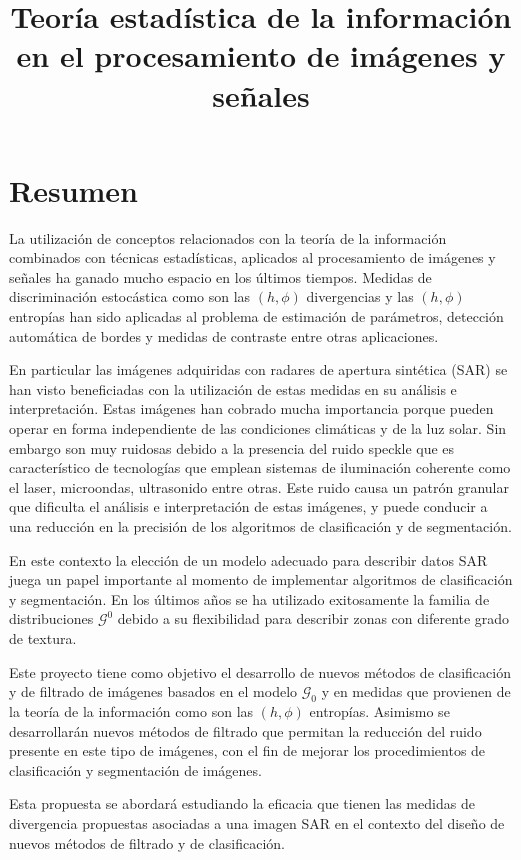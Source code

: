 \documentclass[11pt]{article}
\title{\textbf{Teoría estadística de la información \\en el procesamiento de imágenes y señales}}
\date{}
\begin{document}
	
	\maketitle

\section{Resumen}
La utilización de conceptos relacionados con la teoría de la información combinados con técnicas estadísticas, aplicados al procesamiento de imágenes y señales ha ganado mucho espacio en los últimos tiempos. Medidas de discriminación estocástica como son las $(h,\phi)$ divergencias y las $(h,\phi)$ entropías han sido aplicadas al problema de estimación de parámetros, detección automática de bordes y medidas de contraste entre otras aplicaciones. 

En particular las imágenes adquiridas con radares de apertura sintética (SAR) se han visto beneficiadas con la utilización de estas medidas en su análisis e interpretación. Estas imágenes han cobrado mucha importancia porque pueden operar en forma independiente de las condiciones climáticas y de la luz solar. Sin embargo son muy ruidosas debido a la presencia del ruido speckle que es característico de tecnologías que emplean sistemas de iluminación coherente como el laser, microondas, ultrasonido entre otras. Este ruido causa un patrón granular que dificulta el análisis e interpretación de estas imágenes, y puede conducir a una reducción en la precisión de los algoritmos de clasificación y de segmentación. 

En este contexto la elección de un modelo adecuado para describir datos SAR juega un papel importante al momento de implementar algoritmos de clasificación y segmentación. En los últimos años se ha utilizado exitosamente la familia de distribuciones $\mathcal{G}^0$ debido a su flexibilidad para describir zonas con diferente grado de textura.  
 
Este proyecto tiene como objetivo el desarrollo de nuevos métodos de clasificación y de filtrado de imágenes basados en el modelo $\mathcal{G}_0$ y en medidas que provienen de la teoría de la información como son las $(h,\phi)$ entropías. Asimismo se desarrollarán nuevos métodos de filtrado que permitan la reducción del ruido presente en este tipo de imágenes, con el fin de mejorar los procedimientos de clasificación y segmentación de imágenes.

Esta propuesta se abordará  estudiando la eficacia que tienen las medidas de divergencia propuestas asociadas a una imagen SAR en el contexto del diseño de nuevos métodos de filtrado y de clasificación.
\end{document}
